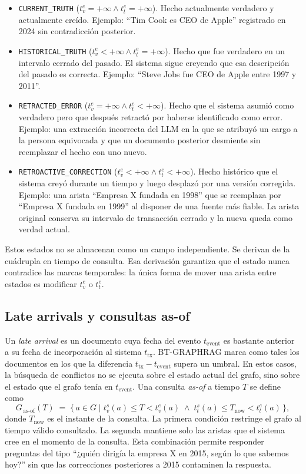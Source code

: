 \begin{itemize}
    \item \texttt{CURRENT\_TRUTH} ($t_v^e = +\infty \wedge t_t^e = +\infty$). Hecho actualmente verdadero y actualmente creído. Ejemplo: ``Tim Cook es CEO de Apple'' registrado en 2024 sin contradicción posterior.
    \item \texttt{HISTORICAL\_TRUTH} ($t_v^e < +\infty \wedge t_t^e = +\infty$). Hecho que fue verdadero en un intervalo cerrado del pasado. El sistema sigue creyendo que esa descripción del pasado es correcta. Ejemplo: ``Steve Jobs fue CEO de Apple entre 1997 y 2011''.
    \item \texttt{RETRACTED\_ERROR} ($t_v^e = +\infty \wedge t_t^e < +\infty$). Hecho que el sistema asumió como verdadero pero que después retractó por haberse identificado como error. Ejemplo: una extracción incorrecta del LLM en la que se atribuyó un cargo a la persona equivocada y que un documento posterior desmiente sin reemplazar el hecho con uno nuevo.
    \item \texttt{RETROACTIVE\_CORRECTION} ($t_v^e < +\infty \wedge t_t^e < +\infty$). Hecho histórico que el sistema creyó durante un tiempo y luego desplazó por una versión corregida. Ejemplo: una arista ``Empresa X fundada en 1998'' que se reemplaza por ``Empresa X fundada en 1999'' al disponer de una fuente más fiable. La arista original conserva su intervalo de transacción cerrado y la nueva queda como verdad actual.
\end{itemize}

Estos estados no se almacenan como un campo independiente. Se derivan de la cuádrupla en tiempo de consulta. Esa derivación garantiza que el estado nunca contradice las marcas temporales: la única forma de mover una arista entre estados es modificar $t_v^e$ o $t_t^e$.

\subsection{Late arrivals y consultas as-of}

Un \emph{late arrival} es un documento cuya fecha del evento $t_{\text{event}}$ es bastante anterior a su fecha de incorporación al sistema $t_{\text{tx}}$. BT-GRAPHRAG marca como tales los documentos en los que la diferencia $t_{\text{tx}} - t_{\text{event}}$ supera un umbral. En estos casos, la búsqueda de conflictos no se ejecuta sobre el estado actual del grafo, sino sobre el estado que el grafo tenía en $t_{\text{event}}$. Una consulta \emph{as-of} a tiempo $T$ se define como
\begin{equation}
G_{\,\text{as-of}}(T) \;=\; \bigl\{\, a \in G \;\big|\; t_v^s(a) \le T < t_v^e(a) \;\wedge\; t_t^s(a) \le T_{\text{now}} < t_t^e(a) \,\bigr\},
\end{equation}
donde $T_{\text{now}}$ es el instante de la consulta. La primera condición restringe el grafo al tiempo válido consultado. La segunda mantiene solo las aristas que el sistema cree en el momento de la consulta. Esta combinación permite responder preguntas del tipo ``¿quién dirigía la empresa X en 2015, según lo que sabemos hoy?'' sin que las correcciones posteriores a 2015 contaminen la respuesta.

